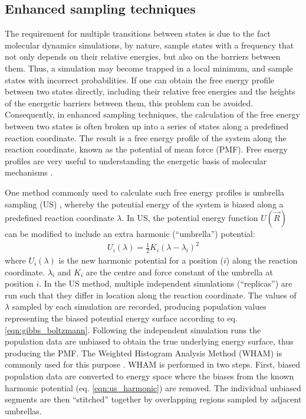 \subsection{Enhanced sampling techniques}

The requirement for multiple transitions between states is due to the fact molecular dynamics simulations, by nature, sample states with a frequency that not only depends on their relative energies, but also on the barriers between them. Thus, a simulation may become trapped in a local minimum, and sample states with incorrect probabilities. If one can obtain the free energy profile between two states directly, including their relative free energies and the heights of the energetic barriers between them, this problem can be avoided. Consequently, in enhanced sampling techniques, the calculation of the free energy between two states is often broken up into a series of states along a predefined reaction coordinate. The result is a free energy profile of the system along the reaction coordinate, known as the potential of mean force (PMF). Free energy profiles are very useful to understanding the energetic basis of molecular mechanisms \cite{Roux:2004ul,Henry:2011p10221,Henry:2009p4543}.

One method commonly used to calculate such free energy profiles is umbrella sampling (US) \cite{Torrie:1974p5323}, whereby the potential energy of the system is biased along a predefined reaction coordinate $\lambda$. In US, the potential energy function $U(\vec{R})$ can be modified to include an extra harmonic (``umbrella'') potential:
\begin{align}
\label{eqn:us_harmonic}
U_i(\lambda) = \frac{1}{2}K_i(\lambda - \lambda_i)^2
\end{align}
where $U_i(\lambda)$ is the new harmonic potential for a position ($i$) along the reaction coordinate. $\lambda_i$ and $K_i$ are the centre and force constant of the umbrella at position $i$. In the US method, multiple independent simulations (``replicas'') are run such that they differ in location along the reaction coordinate. The values of $\lambda$ sampled by each simulation are recorded, producing population values representing the biased potential energy surface according to eq. \ref{eqn:gibbs_boltzmann}. Following the independent simulation runs the population data are unbiased to obtain the true underlying energy surface, thus producing the PMF. The Weighted Histogram Analysis Method (WHAM) is commonly used for this purpose \cite{Kumar:1995p5435}. WHAM is performed in two steps. First, biased population data are converted to energy space where the biases from the known harmonic potential (eq. \ref{eqn:us_harmonic}) are removed. The individual unbiased segments are then ``stitched'' together by overlapping regions sampled by adjacent umbrellas.

